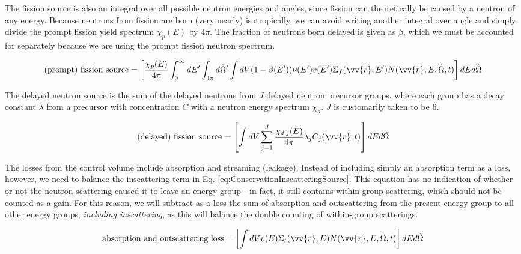 \documentclass[10pt]{article}
\newcommand{\hO}{\hat{\Omega}}
\begin{document}
\begin{flushleft}
The fission source is also an integral over all possible neutron energies and angles, since fission can theoretically be caused by a neutron of any energy. Because neutrons from fission are born (very nearly) isotropically, we can avoid writing another integral over angle and simply divide the prompt fission yield spectrum \(\chi_p(E)\) by \(4\pi\). The fraction of neutrons born delayed is given as \(\beta\), which we must be accounted for separately because we are using the prompt fission neutron spectrum.

\begin{equation}
\label{eq:ConservationFissionPrompt}
\textrm{(prompt) fission source} = \left\lbrack\frac{\chi_p(E)}{4\pi} \int_{0}^{\infty} dE'\int_{4\pi}^{} d\hO  '\int dV (1-\beta(E'))\nu(E')v(E')\Sigma_f(\vv{r},E')N(\vv{r}, E, \hO  ,t)\right\rbrack dEd\hO  
\end{equation}

The delayed neutron source is the sum of the delayed neutrons from \(J\) delayed neutron precursor groups, where each group has a decay constant \(\lambda\) from a precursor with concentration \(C\) with a neutron energy spectrum \(\chi_d\). \(J\) is customarily taken to be 6.

\begin{equation}
\label{eq:ConservationFissionDelayed}
\textrm{(delayed) fission source} = \left\lbrack\int dV \sum_{j=1}^{J} \frac{\chi_{d,j}(E)}{4\pi} \lambda_j C_j(\vv{r}, t)\right\rbrack dEd\hO  
\end{equation}

The losses from the control volume include absorption and streaming (leakage). Instead of including simply an absorption term as a loss, however, we need to balance the inscattering term in Eq. \ref{eq:ConservationInscatteringSource}. This equation has no indication of whether or not the neutron scattering caused it to leave an energy group - in fact, it still contains within-group scattering, which should not be counted as a gain. For this reason, we will subtract as a loss the sum of absorption and outscattering from the present energy group to all other energy groups, \textit{including inscattering}, as this will balance the double counting of within-group scatterings. 

\begin{equation}
\label{eq:ConservationTotal}
\textrm{absorption and outscattering loss}=\left\lbrack\int dV v(E)\Sigma_t(\vv{r}, E) N(\vv{r}, E, \hO  ,t)\right\rbrack dEd\hO  
\end{equation}


\end{flushleft}
\end{document}
